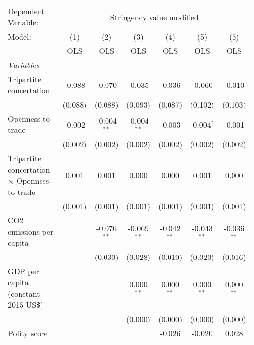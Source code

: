 
\begingroup
\centering
\begin{tabular}{lcccccc}
   \toprule
   Dependent Variable: & \multicolumn{6}{c}{Stringency value modified}\\
   Model:                                              & (1)     & (2)           & (3)           & (4)           & (5)           & (6)\\  
                                                       &  OLS    & OLS           & OLS           & OLS           & OLS           & OLS\\  
   \midrule
   \emph{Variables}\\
   Tripartite concertation                             & -0.088  & -0.070        & -0.035        & -0.036        & -0.060        & -0.010\\   
                                                       & (0.088) & (0.088)       & (0.093)       & (0.087)       & (0.102)       & (0.103)\\   
   Openness to trade                                   & -0.002  & -0.004$^{**}$ & -0.004$^{**}$ & -0.003        & -0.004$^{*}$  & -0.001\\   
                                                       & (0.002) & (0.002)       & (0.002)       & (0.002)       & (0.002)       & (0.002)\\   
   Tripartite concertation $\times$ Openness to trade  & 0.001   & 0.001         & 0.000         & 0.000         & 0.001         & 0.000\\   
                                                       & (0.001) & (0.001)       & (0.001)       & (0.001)       & (0.001)       & (0.001)\\   
   CO2 emissions per capita                            &         & -0.076$^{**}$ & -0.069$^{**}$ & -0.042$^{**}$ & -0.043$^{**}$ & -0.036$^{**}$\\   
                                                       &         & (0.030)       & (0.028)       & (0.019)       & (0.020)       & (0.016)\\   
   GDP per capita (constant 2015 US\$)                 &         &               & 0.000$^{**}$  & 0.000$^{**}$  & 0.000$^{**}$  & 0.000$^{**}$\\   
                                                       &         &               & (0.000)       & (0.000)       & (0.000)       & (0.000)\\   
   Polity score                                        &         &               &               & -0.026        & -0.020        & 0.028\\   

\end{tabular}
